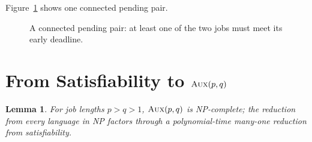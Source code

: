 \documentclass[11pt,a4paper]{article}
\newtheorem{lemma}{Lemma}
\theoremstyle{definition}
\newcommand{\AUX}{\textsc{Aux}}
\newcommand{\NP}{\textnormal{\textsf{NP}}}
\begin{document}
Figure~\ref{fig:pair} shows one connected pending pair.

\begin{figure}[h]
\centering

\caption{A connected pending pair: at least one of the two jobs must meet
its early deadline.}
\label{fig:pair}
\end{figure}

\section{From Satisfiability to $\AUX(p,q)$}

\setcounter{lemma}{1}
\begin{lemma}
\label{lem:lemma2}
For job lengths $p>q>1$, $\AUX(p,q)$ is \NP-complete; the reduction from
every language in \NP{} factors through a polynomial-time many-one reduction
from satisfiability.
\end{lemma}
\end{document}
